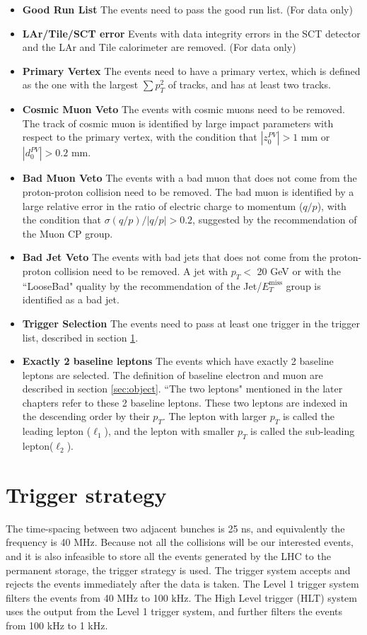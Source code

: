 \begin{itemize}
\item \textbf{Good Run List} The events need to pass the good run list. (For data only)
\item \textbf{LAr/Tile/SCT error} Events with data integrity errors in the SCT detector and the LAr and Tile calorimeter are removed. (For data only)
\item \textbf{Primary Vertex} The events need to have a primary vertex, which is defined as the one with the largest $\sum p_{T}^{2}$ of tracks, and has at least two tracks.
\item \textbf{Cosmic Muon Veto} The events with cosmic muons need to be removed. The track of cosmic muon is identified by large impact parameters with respect to the primary vertex, with the condition that $|z_{0}^{PV}|>1$ mm or $|d_{0}^{PV}|>0.2$ mm.
\item \textbf{Bad Muon Veto} The events with a bad muon that does not come from the proton-proton collision need to be removed. The bad muon is identified by a large relative error in the ratio of electric charge to momentum ($q/p$), with the condition that $\sigma(q/p) / |q/p| > 0.2$, suggested by the recommendation of the Muon CP group. \cite{muons}
\item \textbf{Bad Jet Veto} The events with bad jets that does not come from the proton-proton collision need to be removed. A jet with $p_{T}<$ 20 GeV or with the ``LooseBad" quality by the recommendation of the Jet/$E_T^{\text{miss}}$ group is identified as a bad jet.
\item \textbf{Trigger Selection} The events need to pass at least one trigger in the trigger list, described in section \ref{sec:trigger}.
\item \textbf{Exactly 2 baseline leptons} The events which have exactly 2 baseline leptons are selected. The definition of baseline electron and muon are described in section \ref{sec:object}. ``The two leptons" mentioned in the later chapters refer to these 2 baseline leptons. These two leptons are indexed in the descending order by their $p_T$. The lepton with larger $p_T$ is called the leading lepton ($\ell_1$), and the lepton with smaller $p_T$ is called the sub-leading lepton($\ell_2$).
\end{itemize}

\section{Trigger strategy}
\label{sec:trigger}
The time-spacing between two adjacent bunches is 25 ns, and equivalently the frequency is 40 MHz.
Because not all the collisions will be our interested events, and it is also infeasible to store all the events generated by the LHC to the permanent storage, the trigger strategy is used.
The trigger system accepts and rejects the events immediately after the data is taken.
The Level 1 trigger system filters the events from 40 MHz to 100 kHz.
The High Level trigger (HLT) system uses the output from the Level 1 trigger system, and further filters the events from 100 kHz to 1 kHz.

